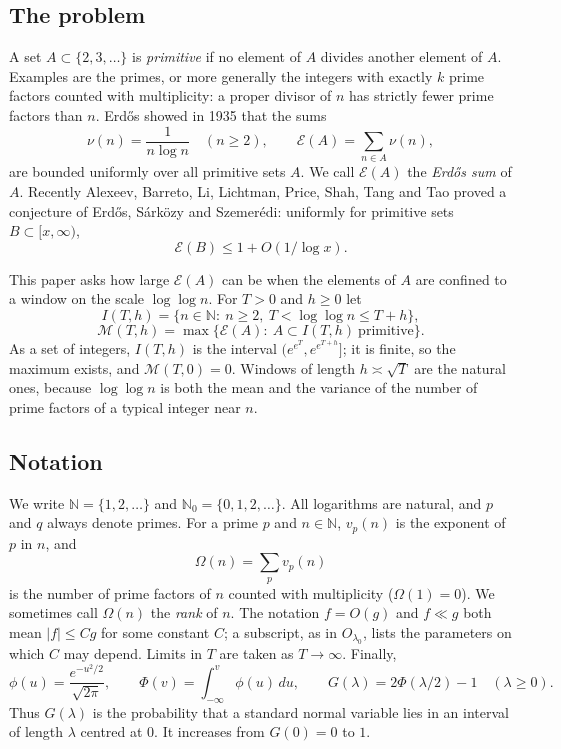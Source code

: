 \documentclass[11pt,a4paper]{article}
\numberwithin{equation}{section}
\theoremstyle{plain}
\theoremstyle{definition}
\theoremstyle{remark}
\newcommand{\N}{\mathbb{N}}
\newcommand{\cE}{\mathcal{E}}
\newcommand{\cM}{\mathcal{M}}
\begin{document}
\subsection{The problem}
A set $A\subset\{2,3,\dots\}$ is \emph{primitive} if no element of $A$ divides another element of $A$. Examples are the primes, or more generally the integers with exactly $k$ prime factors counted with multiplicity: a proper divisor of $n$ has strictly fewer prime factors than $n$. Erd\H{o}s showed in 1935 that the sums
\[
\nu(n)=\frac{1}{n\log n}\quad(n\ge2),\qquad \cE(A)=\sum_{n\in A}\nu(n),
\]
are bounded uniformly over all primitive sets $A$. We call $\cE(A)$ the \emph{Erd\H{o}s sum} of $A$. Recently Alexeev, Barreto, Li, Lichtman, Price, Shah, Tang and Tao \cite[Theorem~1.1]{ABLLPSTT} proved a conjecture of Erd\H{o}s, S\'ark\"ozy and Szemer\'edi: uniformly for primitive sets $B\subset[x,\infty)$,
\begin{equation}\label{eq:tail}
\cE(B)\le 1+O(1/\log x).
\end{equation}

This paper asks how large $\cE(A)$ can be when the elements of $A$ are confined to a window on the scale $\log\log n$. For $T>0$ and $h\ge0$ let
\[
I(T,h)=\{n\in\N:\ n\ge2,\ T<\log\log n\le T+h\},
\]
\[
\cM(T,h)=\max\{\cE(A):\ A\subset I(T,h)\ \text{primitive}\}.
\]
As a set of integers, $I(T,h)$ is the interval $(e^{e^T},e^{e^{T+h}}]$; it is finite, so the maximum exists, and $\cM(T,0)=0$. Windows of length $h\asymp\sqrt T$ are the natural ones, because $\log\log n$ is both the mean and the variance of the number of prime factors of a typical integer near $n$.

\subsection{Notation}
We write $\N=\{1,2,\dots\}$ and $\N_0=\{0,1,2,\dots\}$. All logarithms are natural, and $p$ and $q$ always denote primes. For a prime $p$ and $n\in\N$, $v_p(n)$ is the exponent of $p$ in $n$, and
\[
\Omega(n)=\sum_p v_p(n)
\]
is the number of prime factors of $n$ counted with multiplicity ($\Omega(1)=0$). We sometimes call $\Omega(n)$ the \emph{rank} of $n$. The notation $f=O(g)$ and $f\ll g$ both mean $|f|\le Cg$ for some constant $C$; a subscript, as in $O_{\lambda_0}$, lists the parameters on which $C$ may depend. Limits in $T$ are taken as $T\to\infty$. Finally,
\[
\phi(u)=\frac{e^{-u^2/2}}{\sqrt{2\pi}},\qquad \Phi(v)=\int_{-\infty}^v\phi(u)\,du,\qquad
G(\lambda)=2\Phi(\lambda/2)-1\quad(\lambda\ge0).
\]
Thus $G(\lambda)$ is the probability that a standard normal variable lies in an interval of length $\lambda$ centred at $0$. It increases from $G(0)=0$ to $1$.
\end{document}
